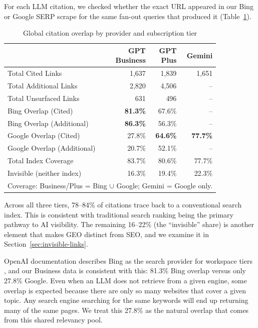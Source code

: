 For each LLM citation, we checked whether the exact URL appeared in our Bing or Google SERP scrape for 
the same fan-out queries that produced it (Table~\ref{tab:global-overlap}).

\begin{table}[H]
\centering
\caption{Global citation overlap by provider and subscription tier}
\label{tab:global-overlap}
\small
\begin{tabular}{@{}lrrr@{}}
\toprule
 & \makecell[r]{GPT\\Business} & \makecell[r]{GPT\\Plus} & Gemini \\
\midrule
Total Cited Links & 1,637 & 1,839 & 1,651 \\
Total Additional Links & 2,820 & 4,506 & -- \\
Total Unsurfaced Links & 631 & 496 & -- \\
Bing Overlap (Cited) & \textbf{81.3\%} & 67.6\% & -- \\
Bing Overlap (Additional) & \textbf{86.3\%} & 56.3\% & -- \\
Google Overlap (Cited) & 27.8\% & \textbf{64.6\%} & \textbf{77.7\%} \\
Google Overlap (Additional) & 20.7\% & 52.1\% & -- \\
\midrule
Total Index Coverage & 83.7\% & 80.6\% & 77.7\% \\
Invisible (neither index) & 16.3\% & 19.4\% & 22.3\% \\
\bottomrule
\multicolumn{4}{l}{\scriptsize Coverage: Business/Plus = Bing $\cup$ Google; Gemini = Google only.}
\end{tabular}
\end{table}

Across all three tiers, 78--84\% of citations trace back to a conventional search index. 
This is consistent with traditional search ranking being the primary pathway to AI visibility. The remaining 16--22\% (the ``invisible'' share) is another element that makes GEO distinct from SEO,
 and we examine it in Section~\ref{sec:invisible-links}.

OpenAI documentation describes Bing as the search provider for workspace tiers \parencite{openai2024enterprise}, and our Business data is consistent with this: 81.3\% Bing overlap versus only 27.8\% Google. Even when an LLM does not retrieve from a given engine, some overlap is expected because there are only so many websites that cover a given topic. Any search engine searching for the same keywords will end up returning many of the same pages. We treat this 27.8\% as the natural overlap that comes from this shared relevancy pool.

